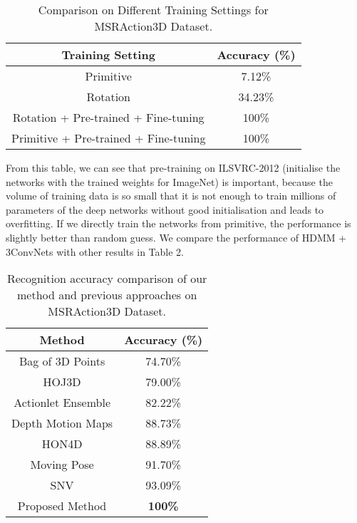 \documentclass[conference]{IEEEtran}
\begin{document}
\begin{table}[h]
\centering
\caption{Comparison on Different Training Settings for MSRAction3D Dataset.}
\begin{tabular}{|c|c|}
\hline
Training Setting & Accuracy (\%)\\
\hline
Primitive & 7.12\%  \\
\hline
Rotation &34.23\%\\
\hline
Rotation + Pre-trained + Fine-tuning & 100\%  \\
\hline
Primitive + Pre-trained + Fine-tuning & 100\%  \\
\hline
\end{tabular}
\end{table}
From this table, we can see that pre-training on ILSVRC-2012 (initialise the networks with the trained weights for ImageNet) is important, because the volume of training data is so small that it is not enough to train millions of parameters of the deep networks without good initialisation and leads to overfitting. If we directly train the networks from primitive, the performance is slightly better than random guess.
We compare the performance of HDMM + 3ConvNets with other results in Table 2.

\begin{table}[h]
\centering
\caption{Recognition accuracy comparison of our method and previous approaches on MSRAction3D Dataset.}
\begin{tabular}{|c|c|}
\hline
Method & Accuracy (\%)\\
\hline
Bag of 3D Points \cite{Li2010} & 74.70\%  \\
\hline
HOJ3D \cite{xia2012view} & 79.00\%\\
\hline
Actionlet Ensemble \cite{wang2012mining} & 82.22\%  \\
\hline
Depth Motion Maps \cite{Yang2012a} & 88.73\%  \\
\hline
HON4D \cite{wang2012mining} & 88.89\%  \\
\hline
Moving Pose \cite{zanfir2013moving} & 91.70\%  \\
\hline
SNV \cite{yangsuper} & 93.09\%  \\
\hline
Proposed Method & \textbf{100\%}  \\
\hline
\end{tabular}
\end{table}
\end{document}
